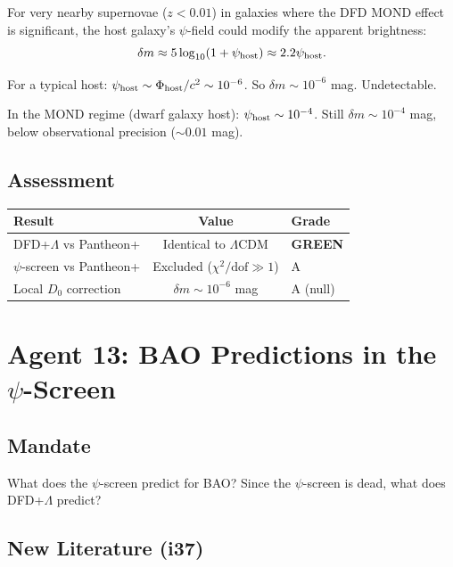 \documentclass[11pt,a4paper]{article}
\newcommand{\GREEN}{\textcolor{dfdgreen}{\textbf{GREEN}}}
\begin{document}
For very nearby supernovae ($z < 0.01$) in galaxies where the DFD MOND effect is significant, the host galaxy's $\psi$-field could modify the apparent brightness:
\begin{equation}
\delta m \approx 5\log_{10}(1 + \psi_{\rm host}) \approx 2.2\psi_{\rm host}.
\end{equation}

For a typical host: $\psi_{\rm host} \sim \Phi_{\rm host}/c^2 \sim 10^{-6}$. So $\delta m \sim 10^{-6}$ mag. Undetectable.

In the MOND regime (dwarf galaxy host): $\psi_{\rm host} \sim 10^{-4}$. Still $\delta m \sim 10^{-4}$ mag, below observational precision ($\sim 0.01$ mag).

\subsection{Assessment}

\begin{center}
\begin{tabular}{lcl}
\toprule
\textbf{Result} & \textbf{Value} & \textbf{Grade} \\
\midrule
DFD+$\Lambda$ vs Pantheon+ & Identical to $\Lambda$CDM & \GREEN \\
$\psi$-screen vs Pantheon+ & Excluded ($\chi^2/\text{dof} \gg 1$) & A \\
Local $D_0$ correction & $\delta m \sim 10^{-6}$ mag & A (null) \\
\bottomrule
\end{tabular}
\end{center}

\newpage
\section{Agent 13: BAO Predictions in the $\psi$-Screen}
\label{sec:agent13}

\subsection{Mandate}

What does the $\psi$-screen predict for BAO? Since the $\psi$-screen is dead, what does DFD+$\Lambda$ predict?

\subsection{New Literature (i37)}
\end{document}
